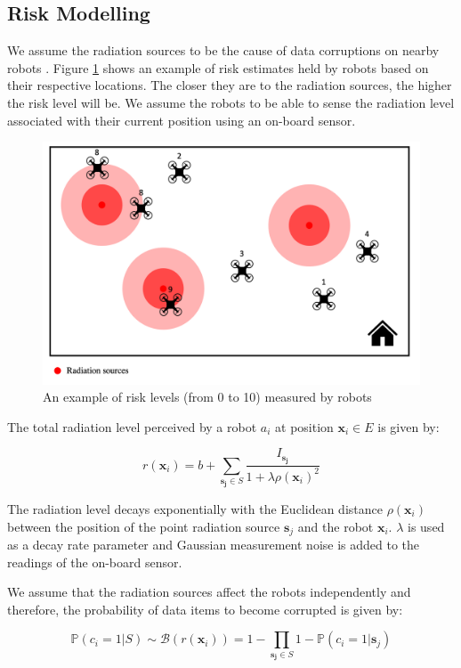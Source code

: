 \subsection{Risk Modelling}
We assume the radiation sources to be the cause of data corruptions on nearby robots \cite{sharp1996radiation,messenger1986effects}. Figure \ref{risk_level_rass} shows an example of risk estimates held by robots based on their respective locations. The closer they are to the radiation sources, the higher the risk level will be. We assume the robots to be able to sense the radiation level associated with their current position using an on-board sensor.

\begin{figure}[htbp]
	\centering
    \includegraphics[width=0.75\columnwidth]{images/risk_rass.png}
    \caption{An example of risk levels (from 0 to 10) measured by robots}
    \label{risk_level_rass}
\end{figure}

The total radiation level perceived by a robot $a_i$ at position $\bm{x}_i \in E$ is given by:

\begin{equation}
    r(\bm{x}_i) = b + \sum_{\bm{s_j} \in S} \frac{I_{\bm{s_j}}}{1 + \lambda\rho(\bm{x}_i)^2}
    \label{eq:radiationRASS}
\end{equation}

The radiation level decays exponentially with the Euclidean distance $\rho(\bm{x}_i)$ between the position of the point radiation source $\bm{s}_j$ and the robot $\bm{x}_i$. $\lambda$ is used as a decay rate parameter and Gaussian measurement noise is added to the readings of the on-board sensor. 

We assume that the radiation sources affect the robots independently and therefore, the probability of data items to become corrupted is given by:

\begin{equation}
    \mathbb{P}(c_i = 1 | S) \sim \mathcal{B}(r(\bm{x}_i)) = 1 - \prod_{\bm{s_j} \in S} 1 - \mathbb{P}(c_i = 1 | \bm{s}_j)
    \label{eq:failureRASS}
\end{equation}


